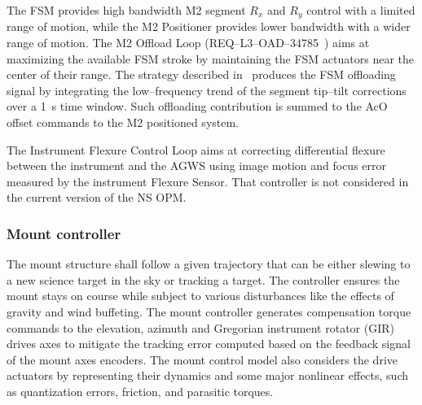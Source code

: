 \documentclass{gmto}
\begin{document}
The FSM provides high bandwidth M2 segment $R_x$ and $R_y$ control with a limited range of motion, while the M2 Positioner provides lower bandwidth with a wider range of motion. The M2 Offload Loop (REQ--L3--OAD--34785~\cite{OAD}) aims at maximizing the available FSM stroke by maintaining the FSM actuators near the center of their range. The strategy described in~\cite[Section 6.4]{GMTO.NS.Alg.DOC} produces the FSM offloading signal by integrating the low--frequency trend of the segment tip--tilt corrections over a \SI{1}{s} time window. Such offloading contribution is summed to the AcO offset commands to the M2 positioned system.

The Instrument Flexure Control Loop aims at correcting differential flexure between the instrument and the AGWS using image motion and focus error measured by the instrument Flexure Sensor. That controller is not considered in the current version of the NS OPM.

\subsubsection{Mount controller}
\label{sec:mount-ctrl}

The mount structure shall follow a given trajectory that can be either slewing to a new science target in the sky or tracking a target. The controller ensures the mount stays on course while subject to various disturbances like the effects of gravity and wind buffeting. The mount controller generates compensation torque commands to the elevation, azimuth and Gregorian instrument rotator (GIR) drives axes to mitigate the tracking error computed based on the feedback signal of the mount axes encoders.  The mount control model also considers the drive actuators by representing their dynamics and some major nonlinear effects, such as quantization errors, friction, and parasitic torques.
\end{document}
